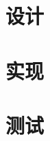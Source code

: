 \documentclass[zihao=-4,a4,seagreen,openany]{ibook}
\begin{document}
\frontmatter
\tableofcontents

\mainmatter
\part{设计}


\part{实现}


\part{测试}


\backmatter
\lstlistoflistings
\listoffigures
\printindex
\end{document}
